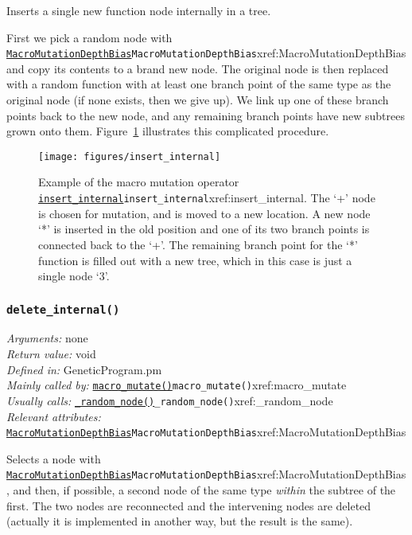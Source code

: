 \documentclass[a4paper]{article}
\begin{document}
Inserts a single new function node internally in a tree.

First we pick a random node with \hyperref[no]{\texttt{MacroMutationDepthBias}}{\texttt{MacroMutationDepthBias}}{xref:MacroMutationDepthBias} and
copy its contents to a brand new node.  The original node is then
replaced with a random function with at least one branch point of the
same type as the original node (if none exists, then we give up).  We
link up one of these branch points back to the new node, and any
remaining branch points have new subtrees grown onto them.
Figure~\ref{fig:insert_internal} illustrates this complicated
procedure.

\begin{figure}
\begin{center}
\texttt{[image: figures/insert\_internal]}
\end{center}
\caption{\label{fig:insert_internal}Example of the macro mutation operator \hyperref[no]{\texttt{insert\_internal}}{\texttt{insert\_internal}}{xref:insert_internal}.  The `+' node is chosen for mutation, and is moved to a new location.  A new node `*' is inserted in the old position and one of its two branch points is connected back to the `+'.  The remaining branch point for the `*' function is filled out with a new tree, which in this case is just a single node `3'.}
\end{figure}

\subsubsection{\texttt{delete\_internal()}}\label{xref:delete_internal}
\begin{flushleft}
\textit{Arguments:} none\\
\textit{Return value:} void\\
\textit{Defined in:} GeneticProgram.pm\\
\textit{Mainly called by:} \hyperref[no]{\texttt{macro\_mutate()}}{\texttt{macro\_mutate()}}{xref:macro_mutate}\\
\textit{Usually calls:} \hyperref[no]{\texttt{\_random\_node()}}{\texttt{\_random\_node()}}{xref:_random_node}\\
\textit{Relevant attributes:} \hyperref[no]{\texttt{MacroMutationDepthBias}}{\texttt{MacroMutationDepthBias}}{xref:MacroMutationDepthBias}
\end{flushleft}

Selects a node with \hyperref[no]{\texttt{MacroMutationDepthBias}}{\texttt{MacroMutationDepthBias}}{xref:MacroMutationDepthBias}, and then, if
possible, a second node of the same type \textit{within} the subtree
of the first.  The two nodes are reconnected and the intervening nodes
are deleted (actually it is implemented in another way, but the result
is the same).
\end{document}

